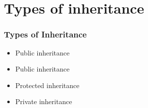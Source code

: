 \documentclass{../ucll-slides}
\begin{document}
\section{Types of inheritance}

\begin{frame}
  \tableofcontents[currentsection]
\end{frame}

\begin{frame}
  \frametitle{Types of Inheritance}
  \begin{itemize}
    \item Public inheritance
  \end{itemize}
  \vskip5mm
  \structure{\cpp}
  \begin{itemize}
    \item Public inheritance
    \item Protected inheritance
    \item Private inheritance
  \end{itemize}
\end{frame}
\end{document}

